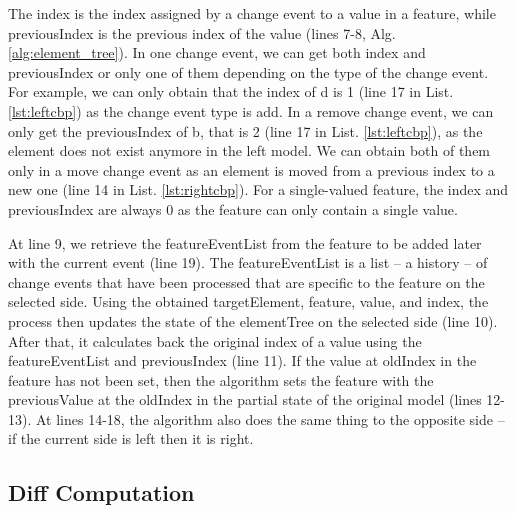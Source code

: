 The \textsf{index} is the index assigned by a change event to a value in a feature, while \textsf{previousIndex} is the previous index of the value (lines 7-8, Alg. \ref{alg:element_tree}). In one change event, we can get both \textsf{index} and \textsf{previousIndex} or only one of them depending on the type of the change event. For example, we can only obtain that the \textsf{index} of \textsf{d} is 1 (line 17 in List. \ref{lst:leftcbp}) as the change event type is \textsf{add}. In a \textsf{remove} change event, we can only get the \textsf{previousIndex} of \textsf{b}, that is 2 (line 17 in List. \ref{lst:leftcbp}), as the element does not exist anymore in the left model. We can obtain both of them only in a \textsf{move} change event as an element is moved from a previous index to a new one (line 14 in List. \ref{lst:rightcbp}). For a single-valued feature, the \textsf{index} and \textsf{previousIndex} are always 0 as the feature can only contain a single value. 

At line 9, we retrieve the \textsf{featureEventList} from the \textsf{feature} to be added later with the current \textsf{event} (line 19). The \textsf{featureEventList} is a list -- a history -- of change events that have been processed that are specific to the \textsf{feature} on the selected \textsf{side}. Using the obtained \textsf{targetElement}, \textsf{feature}, \textsf{value}, and \textsf{index}, the process then updates the state of the \textsf{elementTree} on the selected \textsf{side} (line 10). After that, it calculates back the original index of a value using the \textsf{featureEventList} and \textsf{previousIndex} (line 11). If the value at \textsf{oldIndex} in the \textsf{feature} has not been set, then the algorithm sets the \textsf{feature} with the \textsf{previousValue} at the \textsf{oldIndex} in the partial state of the original model (lines 12-13). At lines 14-18, the algorithm also does the same thing to the opposite side -- if the current \textsf{side} is \textsf{left} then it is \textsf{right}.  

\subsection{Diff Computation}
\label{sec:diff_computation}

